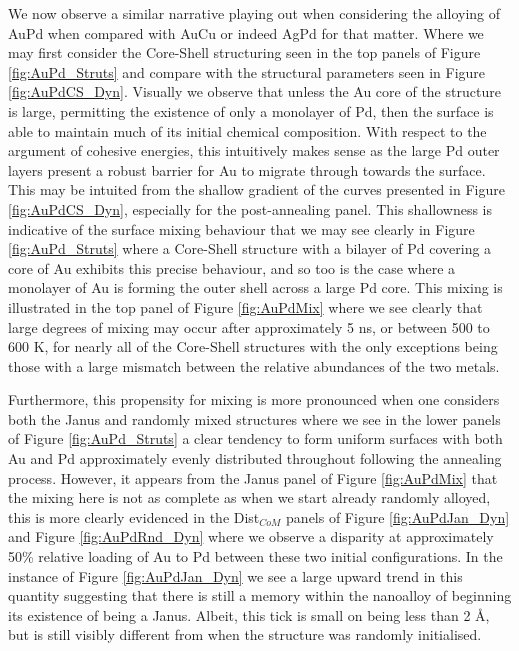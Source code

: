 We now observe a similar narrative playing out when considering the alloying of AuPd when compared with AuCu or indeed AgPd for that matter. Where we may first consider the Core-Shell structuring seen in the top panels of Figure \ref{fig:AuPd_Struts} and compare with the structural parameters seen in Figure \ref{fig:AuPdCS_Dyn}. Visually we observe that unless the Au core of the structure is large, permitting the existence of only a monolayer of Pd, then the surface is able to maintain much of its initial chemical composition. With respect to the argument of cohesive energies, this intuitively makes sense as the large Pd outer layers present a robust barrier for Au to migrate through towards the surface. This may be intuited from the shallow gradient of the curves presented in Figure \ref{fig:AuPdCS_Dyn}, especially for the post-annealing panel. This shallowness is indicative of the surface mixing behaviour that we may see clearly in Figure \ref{fig:AuPd_Struts} where a Core-Shell structure with a bilayer of Pd covering a core of Au exhibits this precise behaviour, and so too is the case where a monolayer of Au is forming the outer shell across a large Pd core. This mixing is illustrated in the top panel of Figure \ref{fig:AuPdMix} where we see clearly that large degrees of mixing may occur after approximately 5 ns, or between 500 to 600 K, for nearly all of the Core-Shell structures with the only exceptions being those with a large mismatch between the relative abundances of the two metals.

Furthermore, this propensity for mixing is more pronounced when one considers both the Janus and randomly mixed structures where we see in the lower panels of Figure \ref{fig:AuPd_Struts} a clear tendency to form uniform surfaces with both Au and Pd approximately evenly distributed throughout following the annealing process. However, it appears from the Janus panel of Figure \ref{fig:AuPdMix} that the mixing here is not as complete as when we start already randomly alloyed, this is more clearly evidenced in the Dist$_{CoM}$ panels of Figure \ref{fig:AuPdJan_Dyn} and Figure \ref{fig:AuPdRnd_Dyn} where we observe a disparity at approximately 50\% relative loading of Au to Pd between these two initial configurations. In the instance of Figure \ref{fig:AuPdJan_Dyn} we see a large upward trend in this quantity suggesting that there is still a memory within the nanoalloy of beginning its existence of being a Janus. Albeit, this tick is small on being less than 2 \AA, but is still visibly different from when the structure was randomly initialised.


